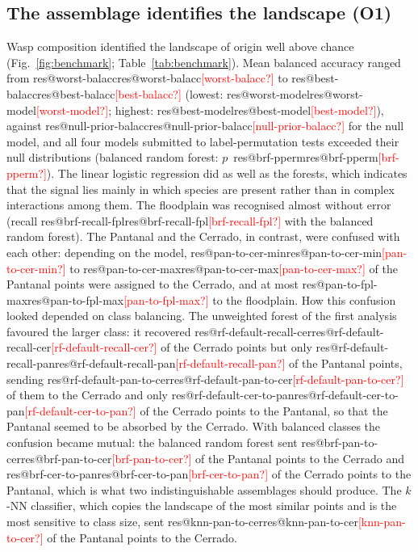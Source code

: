 \documentclass[10pt,a4paper,twocolumn]{article}
\makeatletter
\newcommand{\res}[1]{\ifcsname res@#1\endcsname\csname res@#1\endcsname\else\textcolor{red}{[#1?]}\fi}
\makeatother
\begin{document}
\subsection{The assemblage identifies the landscape (O1)}\label{sec:rO1}
Wasp composition identified the landscape of origin well above chance (Fig.~\ref{fig:benchmark};
Table~\ref{tab:benchmark}). Mean balanced accuracy ranged from \res{worst-balacc} to
\res{best-balacc} (lowest: \res{worst-model}; highest: \res{best-model}), against
\res{null-prior-balacc} for the null model, and all four models submitted to label-permutation tests exceeded their null
distributions (balanced random forest: $p$~\res{brf-pperm}). The linear logistic regression did as
well as the forests, which indicates that the signal lies mainly in which species are present
rather than in complex interactions among them. The floodplain was recognised almost without error
(recall \res{brf-recall-fpl} with the balanced random forest). The Pantanal and the Cerrado, in
contrast, were confused with each other: depending on the model, \res{pan-to-cer-min} to
\res{pan-to-cer-max} of the Pantanal points were assigned to the Cerrado, and at most
\res{pan-to-fpl-max} to the floodplain. How this confusion looked depended on class balancing. The
unweighted forest of the first analysis favoured the larger class: it recovered
\res{rf-default-recall-cer} of the Cerrado points but only \res{rf-default-recall-pan} of the Pantanal
points, sending \res{rf-default-pan-to-cer} of them to the Cerrado and only \res{rf-default-cer-to-pan}
of the Cerrado points to the Pantanal, so that the Pantanal seemed to be absorbed by the Cerrado. With
balanced classes the confusion became mutual: the balanced random forest sent \res{brf-pan-to-cer} of
the Pantanal points to the Cerrado and \res{brf-cer-to-pan} of the Cerrado points to the Pantanal,
which is what two indistinguishable assemblages should produce. The $k$-NN classifier, which copies
the landscape of the most similar points and is the most sensitive to class size, sent
\res{knn-pan-to-cer} of the Pantanal points to the Cerrado.
\end{document}
